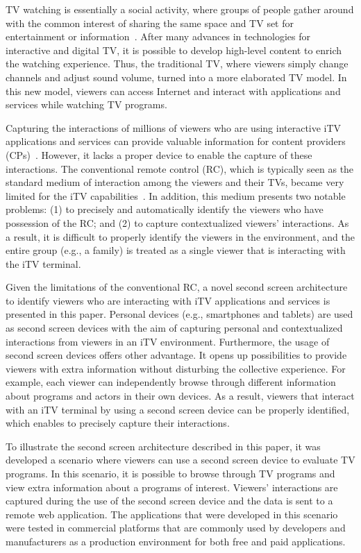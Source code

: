 \documentclass[journal]{IEEEtran}
\begin{document}
TV watching is essentially a social activity, where groups of people gather around with the common interest of sharing the same space and TV set for entertainment or information~\cite{Masthoff2004}. After many advances in technologies for interactive and digital TV, it is possible to develop high-level content to enrich the watching experience. Thus, the traditional TV, where viewers simply change channels and adjust sound volume, turned into a more elaborated TV model. In this new model, viewers can access Internet and interact with applications and services while watching TV programs.

Capturing the interactions of millions of viewers who are using interactive iTV applications and services can provide valuable information for content providers (CPs)~\cite{Teixeira2010}. However, it lacks a proper device to enable the capture of these interactions. The conventional remote control (RC), which is typically seen as the standard medium of interaction among the viewers and their TVs, became very limited for the iTV capabilities~\cite{Jeong2014}. In addition, this medium presents two notable problems: (1) to precisely and automatically identify the viewers who have possession of the RC; and (2) to capture contextualized viewers' interactions. As a result, it is difficult to properly identify the viewers in the environment, and the entire group (e.g., a family) is treated as a single viewer that is interacting with the iTV terminal.

Given the limitations of the conventional RC, a novel second screen architecture to identify viewers who are interacting with iTV applications and services is presented in this paper. Personal devices (e.g., smartphones and tablets) are used as second screen devices with the aim of capturing personal and contextualized interactions from viewers in an iTV environment. Furthermore, the usage of second screen devices offers other advantage. It opens up possibilities to provide viewers with extra information without disturbing the collective experience. For example, each viewer can independently browse through different information about programs and actors in their own devices. As a result, viewers that interact with an iTV terminal by using a second screen device can be properly identified, which enables to precisely capture their interactions. 

To illustrate the second screen architecture described in this paper, it was developed a scenario where viewers can use a second screen device to evaluate TV programs. In this scenario, it is possible to browse through TV programs and view extra information about a programs of interest. Viewers' interactions are captured during the use of the second screen device and the data is sent to a remote web application. The applications that were developed in this scenario were tested in commercial platforms that are commonly used by developers and manufacturers as a production environment for both free and paid applications. 
\end{document}
